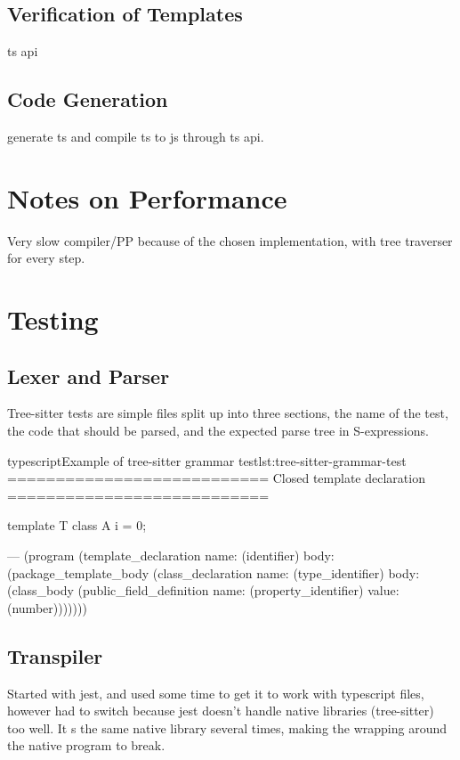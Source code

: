 \subsection{Verification of Templates}\label{subsec:verification-of-templates}

ts api

\subsection{Code Generation}\label{subsec:code-generation}

generate ts and compile ts to js through ts api.

\section{Notes on Performance}\label{sec:notes-on-performance}

Very slow compiler/PP because of the chosen implementation, with tree traverser for every step.


\section{Testing}\label{sec:testing}

\subsection{Lexer and Parser}\label{subsec:testing-lexer-and-parser}

Tree-sitter tests are simple  files split up into three sections, the name of the test, the code that should be parsed, and the expected parse tree in S-expressions\cite{sexprs}.

\begin{code}{typescript}{Example of tree-sitter grammar test}{lst:tree-sitter-grammar-test}
    ===========================
    Closed template declaration
    ===========================

    template T {
        class A {
            i = 0;
        }
    }

    ---
    (program
        (template_declaration
            name: (identifier)
            body: (package_template_body
                    (class_declaration
                        name: (type_identifier)
                        body: (class_body
                            (public_field_definition
                                name: (property_identifier)
                                value: (number)))))))

\end{code}

\subsection{Transpiler}\label{subsec:testing-transpiler}

Started with jest, and used some time to get it to work with typescript files, however had to switch because jest doesn't handle native libraries (tree-sitter) too well.
It s the same native library several times, making the wrapping around the native program to break.